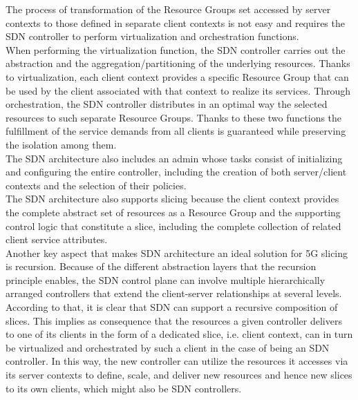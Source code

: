\documentclass[a4paper,12pt]{report} %
\begin{document}
The process of transformation of the Resource Groups set accessed by server contexts to those defined in separate client contexts
is not easy and requires the SDN
controller to perform virtualization and orchestration functions.\\
When performing the virtualization function, the
SDN controller carries out the abstraction and the
aggregation/partitioning of the underlying resources. Thanks to virtualization, each client context provides a specific Resource Group that can be used by the client associated with that context to realize
its services. Through orchestration, the SDN controller distributes in an optimal way the selected resources
to such separate Resource Groups. Thanks to these two functions the fulfillment of the service demands from all clients is guaranteed
while preserving the isolation among them. \\
The SDN architecture also includes an admin whose tasks consist of initializing and configuring the entire controller, including the creation
of both server/client contexts and the selection of their policies.\\
The SDN architecture also supports slicing because the client context provides the complete abstract set of resources as a Resource Group and the supporting control
logic that constitute a slice, including the complete
collection of related client service attributes.\\
Another key aspect that makes SDN
architecture an ideal solution for 5G slicing is recursion. Because of the different abstraction layers
that the recursion principle enables, the SDN
control plane can involve multiple hierarchically
arranged controllers that extend the client-server
relationships at several levels. According to
that, it is clear that SDN can support a
recursive composition of slices. This implies as consequence that
the resources a given controller delivers to one of its clients in the form of a
dedicated slice, i.e. client context, can in turn be
virtualized and orchestrated by such a client in the
case of being an SDN controller. In this way, the new
controller can utilize the resources it accesses via
its server contexts to define, scale, and deliver
new resources and hence new slices to its own
clients, which might also be SDN controllers.
\end{document}
